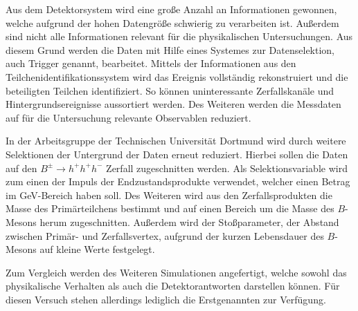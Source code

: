 Aus dem Detektorsystem wird eine große Anzahl an Informationen gewonnen, welche aufgrund der hohen Datengröße schwierig zu verarbeiten ist. Außerdem sind nicht alle Informationen relevant für die physikalischen Untersuchungen. Aus diesem Grund werden die Daten mit Hilfe eines Systemes zur Datenselektion, auch Trigger genannt, bearbeitet.
Mittels der Informationen aus den Teilchenidentifikationssystem wird das Ereignis vollständig rekonstruiert und die beteiligten Teilchen identifiziert. So können uninteressante Zerfallskanäle und Hintergrundsereignisse aussortiert werden. Des Weiteren werden die Messdaten auf für die Untersuchung relevante Observablen reduziert.

In der Arbeitsgruppe der Technischen Universität Dortmund wird durch weitere Selektionen der Untergrund der Daten erneut reduziert. Hierbei sollen die Daten auf den $B^{\pm}\rightarrow h^{+}h^{+}h^{-} $ Zerfall zugeschnitten werden. Als Selektionsvariable wird zum einen der Impuls der Endzustandsprodukte verwendet, welcher einen Betrag im GeV-Bereich haben soll. Des Weiteren wird aus den Zerfallsprodukten die Masse des Primärteilchens bestimmt und auf einen Bereich um die Masse des $B$-Mesons herum zugeschnitten. Außerdem wird der Stoßparameter, der Abstand zwischen Primär- und Zerfallsvertex, aufgrund der kurzen Lebensdauer des $B$-Mesons auf kleine Werte festgelegt.

Zum Vergleich werden des Weiteren Simulationen angefertigt, welche sowohl das physikalische Verhalten als auch die Detektorantworten darstellen können. Für diesen Versuch stehen allerdings lediglich die Erstgenannten zur Verfügung. \cite{anleitung}
